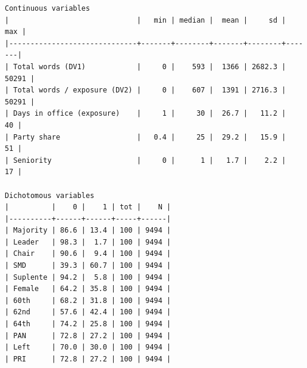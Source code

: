 \documentclass[letter,12pt]{article}
\begin{document}
  \begin{footnotesize}
    \begin{verbatim}
Continuous variables
|                              |   min | median |  mean |     sd |   max |
|------------------------------+-------+--------+-------+--------+-------|
| Total words (DV1)            |     0 |    593 |  1366 | 2682.3 | 50291 |
| Total words / exposure (DV2) |     0 |    607 |  1391 | 2716.3 | 50291 |
| Days in office (exposure)    |     1 |     30 |  26.7 |   11.2 |    40 |
| Party share                  |   0.4 |     25 |  29.2 |   15.9 |    51 |
| Seniority                    |     0 |      1 |   1.7 |    2.2 |    17 |

Dichotomous variables
|          |    0 |    1 | tot |    N |
|----------+------+------+-----+------|
| Majority | 86.6 | 13.4 | 100 | 9494 |
| Leader   | 98.3 |  1.7 | 100 | 9494 |
| Chair    | 90.6 |  9.4 | 100 | 9494 |
| SMD      | 39.3 | 60.7 | 100 | 9494 |
| Suplente | 94.2 |  5.8 | 100 | 9494 |
| Female   | 64.2 | 35.8 | 100 | 9494 |
| 60th     | 68.2 | 31.8 | 100 | 9494 |
| 62nd     | 57.6 | 42.4 | 100 | 9494 |
| 64th     | 74.2 | 25.8 | 100 | 9494 |
| PAN      | 72.8 | 27.2 | 100 | 9494 |
| Left     | 70.0 | 30.0 | 100 | 9494 |
| PRI      | 72.8 | 27.2 | 100 | 9494 |
    \end{verbatim}
  \end{footnotesize}

  



  
\end{document}

